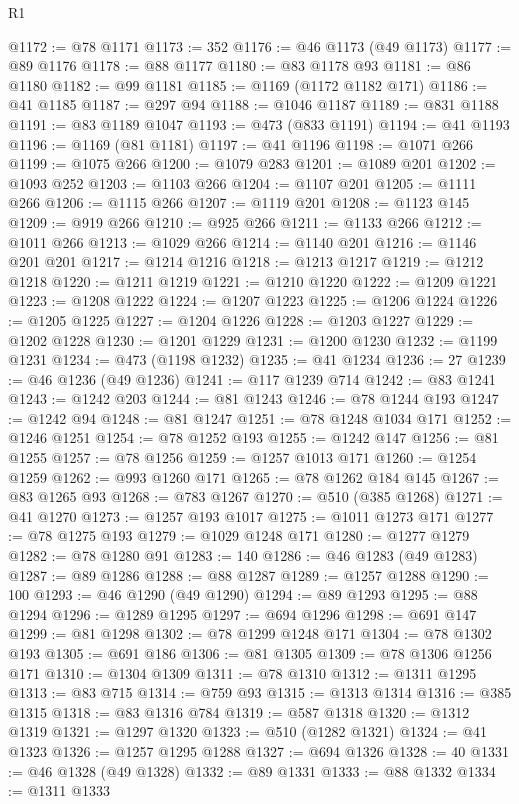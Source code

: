 \begin{lexlean}{R1}
\begin{coremodule}
@1172 := @78 @1171
@1173 := 352
@1176 := @46 @1173 (@49 @1173)
@1177 := @89 @1176
@1178 := @88 @1177
@1180 := @83 @1178 @93
@1181 := @86 @1180
@1182 := @99 @1181
@1185 := @1169 (@1172 @1182 @171)
@1186 := @41 @1185
@1187 := @297 @94
@1188 := @1046 @1187
@1189 := @831 @1188
@1191 := @83 @1189 @1047
@1193 := @473 (@833 @1191)
@1194 := @41 @1193
@1196 := @1169 (@81 @1181)
@1197 := @41 @1196
@1198 := @1071 @266
@1199 := @1075 @266
@1200 := @1079 @283
@1201 := @1089 @201
@1202 := @1093 @252
@1203 := @1103 @266
@1204 := @1107 @201
@1205 := @1111 @266
@1206 := @1115 @266
@1207 := @1119 @201
@1208 := @1123 @145
@1209 := @919 @266
@1210 := @925 @266
@1211 := @1133 @266
@1212 := @1011 @266
@1213 := @1029 @266
@1214 := @1140 @201
@1216 := @1146 @201 @201
@1217 := @1214 @1216
@1218 := @1213 @1217
@1219 := @1212 @1218
@1220 := @1211 @1219
@1221 := @1210 @1220
@1222 := @1209 @1221
@1223 := @1208 @1222
@1224 := @1207 @1223
@1225 := @1206 @1224
@1226 := @1205 @1225
@1227 := @1204 @1226
@1228 := @1203 @1227
@1229 := @1202 @1228
@1230 := @1201 @1229
@1231 := @1200 @1230
@1232 := @1199 @1231
@1234 := @473 (@1198 @1232)
@1235 := @41 @1234
@1236 := 27
@1239 := @46 @1236 (@49 @1236)
@1241 := @117 @1239 @714
@1242 := @83 @1241
@1243 := @1242 @203
@1244 := @81 @1243
@1246 := @78 @1244 @193
@1247 := @1242 @94
@1248 := @81 @1247
@1251 := @78 @1248 @1034 @171
@1252 := @1246 @1251
@1254 := @78 @1252 @193
@1255 := @1242 @147
@1256 := @81 @1255
@1257 := @78 @1256
@1259 := @1257 @1013 @171
@1260 := @1254 @1259
@1262 := @993 @1260 @171
@1265 := @78 @1262 @184 @145
@1267 := @83 @1265 @93
@1268 := @783 @1267
@1270 := @510 (@385 @1268)
@1271 := @41 @1270
@1273 := @1257 @193 @1017
@1275 := @1011 @1273 @171
@1277 := @78 @1275 @193
@1279 := @1029 @1248 @171
@1280 := @1277 @1279
@1282 := @78 @1280 @91
@1283 := 140
@1286 := @46 @1283 (@49 @1283)
@1287 := @89 @1286
@1288 := @88 @1287
@1289 := @1257 @1288
@1290 := 100
@1293 := @46 @1290 (@49 @1290)
@1294 := @89 @1293
@1295 := @88 @1294
@1296 := @1289 @1295
@1297 := @694 @1296
@1298 := @691 @147
@1299 := @81 @1298
@1302 := @78 @1299 @1248 @171
@1304 := @78 @1302 @193
@1305 := @691 @186
@1306 := @81 @1305
@1309 := @78 @1306 @1256 @171
@1310 := @1304 @1309
@1311 := @78 @1310
@1312 := @1311 @1295
@1313 := @83 @715
@1314 := @759 @93
@1315 := @1313 @1314
@1316 := @385 @1315
@1318 := @83 @1316 @784
@1319 := @587 @1318
@1320 := @1312 @1319
@1321 := @1297 @1320
@1323 := @510 (@1282 @1321)
@1324 := @41 @1323
@1326 := @1257 @1295 @1288
@1327 := @694 @1326
@1328 := 40
@1331 := @46 @1328 (@49 @1328)
@1332 := @89 @1331
@1333 := @88 @1332
@1334 := @1311 @1333

\end{coremodule}
\end{lexlean}
